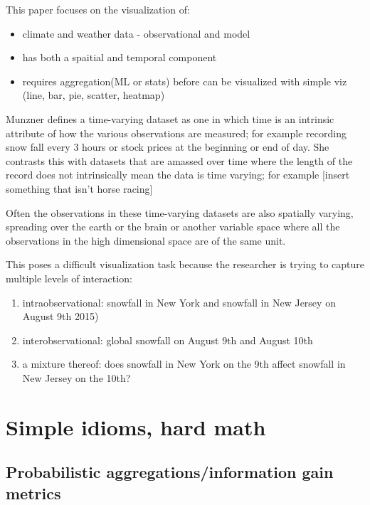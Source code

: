 \documentclass[letterpaper,onecolumn,titlepage]{Ythesis}
\begin{document}
This paper focuses on the visualization of:
\begin{itemize}
\item climate and weather data - observational and model
\item has both a spaitial and temporal component
\item requires aggregation(ML or stats) before can be visualized with simple viz (line, bar, pie, scatter, heatmap)
\end{itemize}





Munzner \cite{Munzner14} defines a time-varying dataset as one in which time is an intrinsic attribute of how the various observations are measured; for example recording snow fall every 3 hours or stock prices at the beginning or end of day. She contrasts this with datasets that are amassed over time where the length of the record does not intrinsically mean the data is time varying; for example [insert something that isn't horse racing] 

Often the observations in these time-varying datasets are also spatially varying, spreading over the earth or the brain or another variable space where all the observations in the high dimensional space are of the same unit. %

This poses a difficult visualization task because the researcher is trying to capture multiple levels of interaction:
\begin{enumerate}
	\item intraobservational: snowfall in New York and snowfall in New Jersey on August 9th 2015)
	\item interobservational: global snowfall on August 9th and August 10th
	\item a mixture thereof: does snowfall in New York on the 9th affect snowfall in New Jersey on the 10th?
\end{enumerate}


\section{Simple idioms, hard math}

\subsection{Probabilistic aggregations/information gain metrics}
\label{sec:probabilistic}
\end{document}
